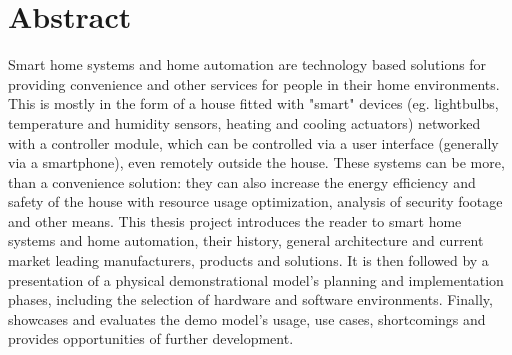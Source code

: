 \chapter*{Abstract}

Smart home systems and home automation are technology based solutions for providing convenience and other services for people in their home environments. This is mostly in the form of a house fitted with "smart" devices (eg. lightbulbs, temperature and humidity sensors, heating and cooling actuators) networked with a controller module, which can be controlled via a user interface (generally via a smartphone), even remotely outside the house. These systems can be more, than a convenience solution: they can also increase the energy efficiency and safety of the house with resource usage optimization, analysis of security footage and other means. This thesis project introduces the reader to smart home systems and home automation, their history, general architecture and current market leading manufacturers, products and solutions. It is then followed by a presentation of a physical demonstrational model's planning and implementation phases, including the selection of hardware and software environments. Finally, showcases and evaluates the demo model's usage, use cases, shortcomings and provides opportunities of further development.







\vfill
\selectthesislanguage

\setcounter{romanPage}{\value{page}}
